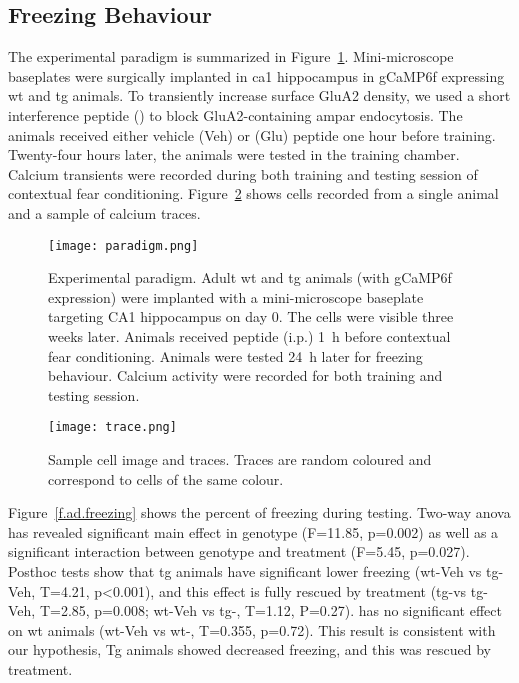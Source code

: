 \subsection{Freezing Behaviour}
The experimental paradigm is summarized in Figure~\ref{f.ad.paradigm}. Mini-microscope baseplates were surgically implanted in \gls{ca1} hippocampus in gCaMP6f expressing \gls{wt} and \gls{tg} animals. To transiently increase surface GluA2 density, we used a short interference peptide (\tglu) to block GluA2-containing \gls{ampar} endocytosis. The animals received either vehicle (Veh) or \tglu{} (Glu) peptide one hour before training. Twenty-four hours later, the animals were tested in the training chamber. Calcium transients were recorded during both training and testing session of contextual fear conditioning. Figure~\ref{f.ad.trace} shows cells recorded from a single animal and a sample of calcium traces. 
\begin{figure}[h]
    \texttt{[image: paradigm.png]}
    \caption{Experimental paradigm. Adult \gls{wt} and \gls{tg} animals (with gCaMP6f expression) were implanted with a mini-microscope baseplate targeting CA1 hippocampus on day 0. The cells were visible three weeks later. Animals received \tglu peptide (i.p.) \SI{1}{\hour} before contextual fear conditioning. Animals were tested \SI{24}{\hour} later for freezing behaviour. Calcium activity were recorded for both training and testing session. \label{f.ad.paradigm}}
\end{figure}

\begin{figure}[h]
    \texttt{[image: trace.png]}
    \caption{Sample cell image and traces. Traces are random coloured and correspond to cells of the same colour. \label{f.ad.trace}}
\end{figure}

Figure~\ref{f.ad.freezing} shows the percent of freezing during testing. Two-way \gls{anova} has revealed significant main effect in genotype (F=11.85, p=0.002) as well as a significant interaction between genotype and treatment (F=5.45, p=0.027). Posthoc tests show that \gls{tg} animals have significant lower freezing (\gls{wt}-Veh vs \gls{tg}-Veh, T=4.21, p<0.001), and this effect is fully rescued by \tglu treatment (\gls{tg}-\tglu vs \gls{tg}-Veh, T=2.85, p=0.008; \gls{wt}-Veh vs \gls{tg}-\tglu, T=1.12, P=0.27). \tglu has no significant effect on \gls{wt} animals (\gls{wt}-Veh vs \gls{wt}-\tglu, T=0.355, p=0.72). This result is consistent with our hypothesis, Tg animals showed decreased freezing, and this was rescued by \tglu treatment. 


